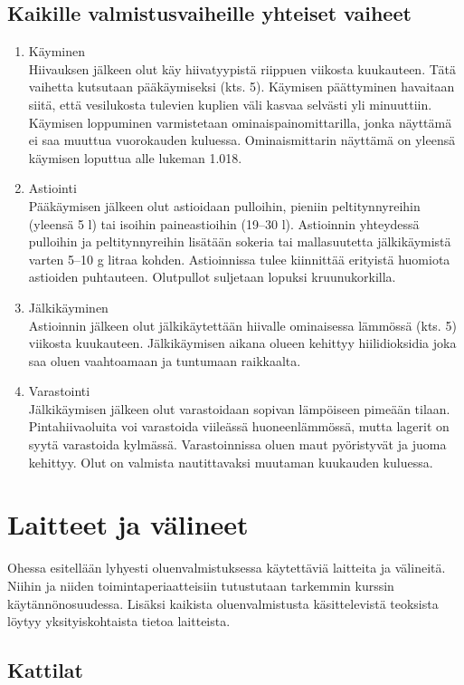 \documentclass[a4paper,11pt]{report}
\begin{document}
\subsection{Kaikille valmistusvaiheille yhteiset vaiheet}
\begin{enumerate}
\item Käyminen \hfill \\
Hiivauksen jälkeen olut käy hiivatyypistä riippuen viikosta kuukauteen. Tätä vaihetta kutsutaan pääkäymiseksi (kts. 5). Käymisen päättyminen havaitaan siitä, että vesilukosta tulevien kuplien väli kasvaa selvästi yli minuuttiin. Käymisen loppuminen varmistetaan ominaispainomittarilla, jonka näyttämä ei saa muuttua vuorokauden kuluessa. Ominaismittarin näyttämä on yleensä käymisen loputtua alle lukeman 1.018.
\item Astiointi \hfill \\
Pääkäymisen jälkeen olut astioidaan pulloihin, pieniin peltitynnyreihin (yleensä 5 l) tai isoihin paineastioihin (19--30 l). Astioinnin yhteydessä pulloihin ja peltitynnyreihin lisätään sokeria tai mallasuutetta jälkikäymistä varten 5--10 g litraa kohden. Astioinnissa tulee kiinnittää erityistä huomiota astioiden puhtauteen. Olutpullot suljetaan lopuksi kruunukorkilla.
\item Jälkikäyminen \hfill \\
Astioinnin jälkeen olut jälkikäytettään hiivalle ominaisessa lämmössä (kts. 5) viikosta kuukauteen. Jälkikäymisen aikana olueen kehittyy hiilidioksidia joka saa oluen vaahtoamaan ja tuntumaan raikkaalta.
\item Varastointi \hfill \\
Jälkikäymisen jälkeen olut varastoidaan sopivan lämpöiseen pimeään tilaan. Pintahiivaoluita voi varastoida viileässä huoneenlämmössä, mutta lagerit on syytä varastoida kylmässä. Varastoinnissa oluen maut pyöristyvät ja juoma kehittyy. Olut on valmista nautittavaksi muutaman kuukauden kuluessa.
\end{enumerate}
\section{Laitteet ja välineet}

Ohessa esitellään lyhyesti oluenvalmistuksessa käytettäviä laitteita ja välineitä. Niihin ja niiden toimintaperiaatteisiin tutustutaan tarkemmin kurssin käytännönosuudessa. Lisäksi kaikista oluenvalmistusta käsittelevistä teoksista löytyy yksityiskohtaista tietoa laitteista.

\subsection*{Kattilat}
\end{document}

